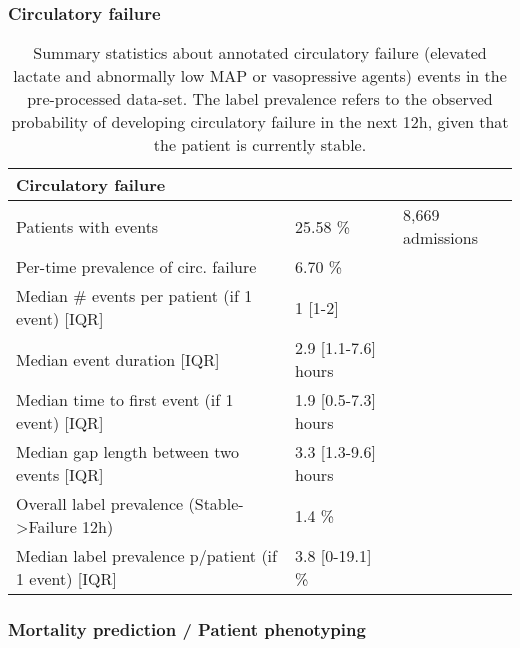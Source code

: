 \documentclass{article}
\begin{document}
\FloatBarrier

\subsubsection*{Circulatory failure}

\begin{table}[ht!]
\caption{Summary statistics about annotated circulatory failure (elevated lactate and abnormally low MAP or vasopressive agents) events in the pre-processed data-set. The label prevalence refers to the observed probability of developing circulatory failure in the next 12h, given that the patient is currently stable.}
\footnotesize
\begin{center}
{\selectfont\small
\begin{tabular}{lll}
\toprule
\textbf{Circulatory failure} & & \\
\midrule
Patients with events & 25.58 \%  & 8,669 admissions \\
Per-time prevalence of circ. failure & 6.70 \% & \\ 
Median \# events per patient (if  1 event) [IQR] & 1 [1-2] & \\
Median event duration [IQR] & 2.9 [1.1-7.6] hours & \\
Median time to first event (if  1 event) [IQR] & 1.9 [0.5-7.3] hours  & \\
Median gap length between two events [IQR] & 3.3 [1.3-9.6] hours & \\
\midrule
Overall label prevalence (Stable->Failure 12h) & 1.4 \% & \\
Median label prevalence p/patient (if  1 event) [IQR] & 3.8 [0-19.1] \%  \\
\bottomrule
\end{tabular}}
\end{center}
\label{tab:appendix-resp-failure-statistics}
\end{table}

\FloatBarrier

\subsubsection*{Mortality prediction / Patient phenotyping}
\end{document}
